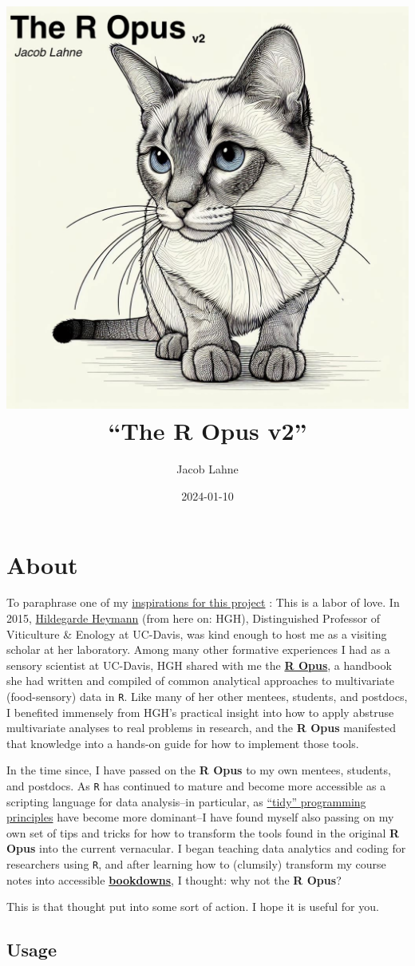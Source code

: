 \documentclass[
]{book}
\title{\includegraphics[width=6in,height=\textheight]{img/r-opus-cover.jpg}\\
``The R Opus v2''}
\author{Jacob Lahne}
\date{2024-01-10}
\begin{document}
\maketitle

{
\setcounter{tocdepth}{1}
\tableofcontents
}
\chapter*{About}\label{about}

To paraphrase one of my \href{https://bookdown.org/content/3890/}{inspirations for this project} \citep{kurzDoingBayesianDataAnalysis2023}: This is a labor of love. In 2015, \href{https://wineserver.ucdavis.edu/people/hildegarde-heymann\#/}{Hildegarde Heymann} (from here on: HGH), Distinguished Professor of Viticulture \& Enology at UC-Davis, was kind enough to host me as a visiting scholar at her laboratory. Among many other formative experiences I had as a sensory scientist at UC-Davis, HGH shared with me the \href{files/The\%20R\%20Opus\%20-\%20May\%202015.pdf}{\textbf{R Opus}}, a handbook she had written and compiled of common analytical approaches to multivariate (food-sensory) data in \texttt{R}. Like many of her other mentees, students, and postdocs, I benefited immensely from HGH's practical insight into how to apply abstruse multivariate analyses to real problems in research, and the \textbf{R Opus} manifested that knowledge into a hands-on guide for how to implement those tools.

In the time since, I have passed on the \textbf{R Opus} to my own mentees, students, and postdocs. As \texttt{R} has continued to mature and become more accessible as a scripting language for data analysis--in particular, as \href{https://r4ds.hadley.nz/}{``tidy'' programming principles} have become more dominant--I have found myself also passing on my own set of tips and tricks for how to transform the tools found in the original \textbf{R Opus} into the current vernacular. I began teaching data analytics and coding for researchers using \texttt{R}, and after learning how to (clumsily) transform my course notes into accessible \textbf{\href{https://bookdown.org/yihui/bookdown/}{bookdowns}}, I thought: why not the \textbf{R Opus}?

This is that thought put into some sort of action. I hope it is useful for you.

\section*{Usage}\label{usage}
\end{document}
